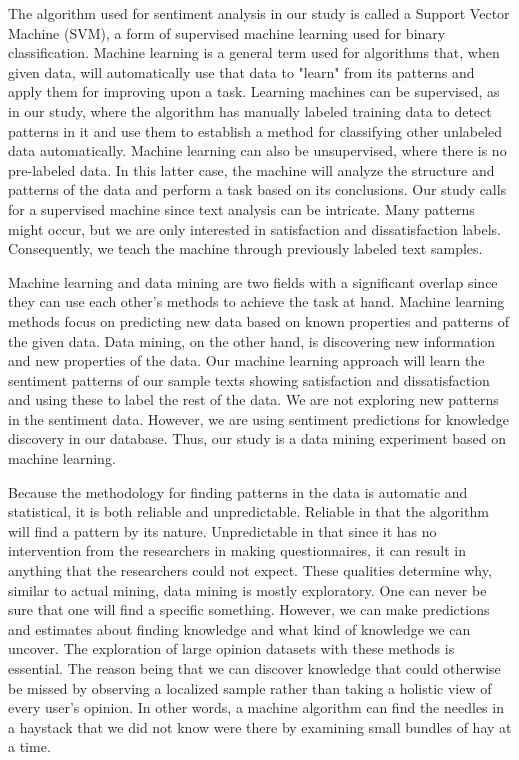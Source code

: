 \documentclass[smallextended,natbib]{svjour3}       %
\begin{document}
    The algorithm used for sentiment analysis in our study is called a Support Vector Machine (SVM), a form of supervised machine learning used for binary classification. Machine learning is a general term used for algorithms that, when given data, will automatically use that data to "learn" from its patterns and apply them for improving upon a task. Learning machines can be supervised, as in our study, where the algorithm has manually labeled training data to detect patterns in it and use them to  establish a method for classifying other unlabeled data automatically. Machine learning can also be unsupervised, where there is no pre-labeled data. In this latter case, the machine will analyze the structure and patterns of the data and perform a task based on its conclusions. Our study calls for a supervised machine since text analysis can be intricate. Many patterns might occur, but we are only interested in satisfaction and dissatisfaction labels. Consequently, we teach the machine through previously labeled text samples. 

    Machine learning and data mining are two fields with a significant overlap since they can use each other's methods to achieve the task at hand. Machine learning methods focus on predicting new data based on known properties and patterns of the given data. Data mining, on the other hand, is discovering new information and new properties of the data. Our machine learning approach will learn the sentiment patterns of our sample texts showing satisfaction and dissatisfaction and using these to label the rest of the data. We are not exploring new patterns in the sentiment data. However, we are using sentiment predictions for knowledge discovery in our database. Thus, our study is a data mining experiment based on machine learning.

    Because the methodology for finding patterns in the data is automatic and statistical, it is both reliable and unpredictable. Reliable in that the algorithm will find a pattern by its nature. Unpredictable in that since it has no intervention from the researchers in making questionnaires, it can result in anything that the researchers could not expect. These qualities determine why, similar to actual mining, data mining is mostly exploratory. One can never be sure that one will find a specific something. However, we can make predictions and estimates about finding knowledge and what kind of knowledge we can uncover. The exploration of large opinion datasets with these methods is essential. The reason being that we can discover knowledge that could otherwise be missed by observing a localized sample rather than taking a holistic view of every user's opinion. In other words, a machine algorithm can find the needles in a haystack that we did not know were there by examining small bundles of hay at a time.
\end{document}
